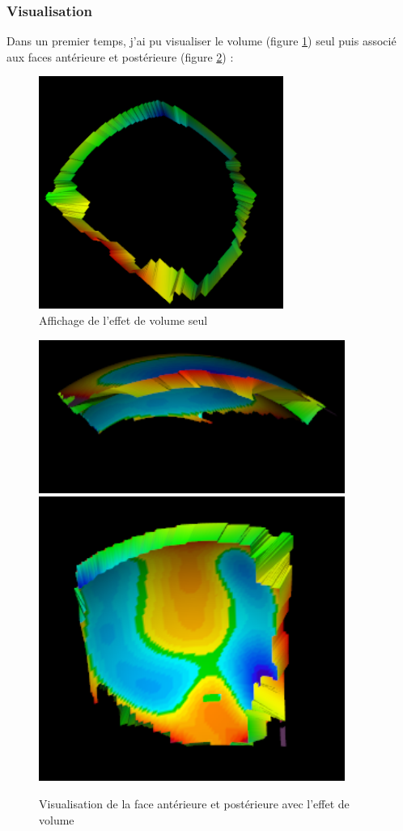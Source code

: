 \documentclass[a4paper,12pt]{article}
\begin{document}
		\subsubsection{Visualisation}

Dans un premier temps, j'ai pu visualiser le volume (figure \ref{Volume}) seul puis associé aux faces antérieure et postérieure (figure \ref{resumeActor}) : 
\begin{figure}[h!]
	\centering
	\includegraphics[width=8cm]{volume.png} 
	\caption{Affichage de l'effet de volume seul}
	\label{Volume}
\end{figure}
\begin{figure}[h!]
	\centering
	\includegraphics[width=10cm]{resumeActor.png} 
	\includegraphics[width=10cm]{volume2.png} 
	\caption{Visualisation de la face antérieure et postérieure avec l'effet de volume}
	\label{resumeActor}
\end{figure}
\end{document}
